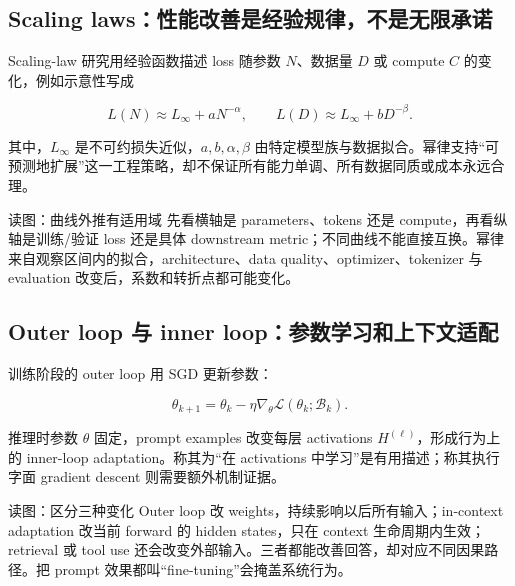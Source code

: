 \subsection{Scaling laws：性能改善是经验规律，不是无限承诺}

Scaling-law 研究用经验函数描述 loss 随参数 $N$、数据量 $D$ 或 compute $C$ 的变化，例如示意性写成

\[
L(N)\approx L_\infty+aN^{-\alpha},\qquad
L(D)\approx L_\infty+bD^{-\beta}.
\]

其中，$L_\infty$ 是不可约损失近似，$a,b,\alpha,\beta$ 由特定模型族与数据拟合。幂律支持“可预测地扩展”这一工程策略，却不保证所有能力单调、所有数据同质或成本永远合理。


\begin{warningbox}{读图：曲线外推有适用域}
先看横轴是 parameters、tokens 还是 compute，再看纵轴是训练/验证 loss 还是具体 downstream metric；不同曲线不能直接互换。幂律来自观察区间内的拟合，architecture、data quality、optimizer、tokenizer 与 evaluation 改变后，系数和转折点都可能变化。
\end{warningbox}

\subsection{Outer loop 与 inner loop：参数学习和上下文适配}

训练阶段的 outer loop 用 SGD 更新参数：

\[
\theta_{k+1}=\theta_k-\eta\nabla_\theta \mathcal L(\theta_k;\mathcal B_k).
\]

推理时参数 $\theta$ 固定，prompt examples 改变每层 activations $H^{(\ell)}$，形成行为上的 inner-loop adaptation。称其为“在 activations 中学习”是有用描述；称其执行字面 gradient descent 则需要额外机制证据。


\begin{knowledgebox}{读图：区分三种变化}
Outer loop 改 weights，持续影响以后所有输入；in-context adaptation 改当前 forward 的 hidden states，只在 context 生命周期内生效；retrieval 或 tool use 还会改变外部输入。三者都能改善回答，却对应不同因果路径。把 prompt 效果都叫“fine-tuning”会掩盖系统行为。
\end{knowledgebox}

